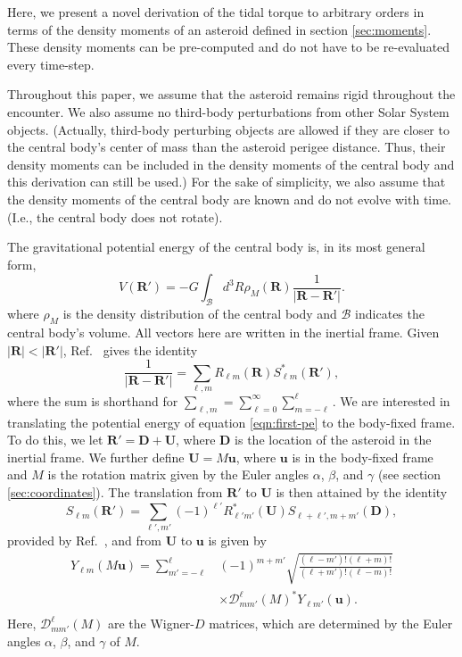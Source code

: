\documentclass[fleqn,usenatbib]{mnras}
\begin{document}
Here, we present a novel derivation of the tidal torque to arbitrary orders in terms of the density moments of an asteroid defined in section \ref{sec:moments}. These density moments can be pre-computed and do not have to be re-evaluated every time-step.

Throughout this paper, we assume that the asteroid remains rigid throughout the encounter. We also assume no third-body perturbations from other Solar System objects. (Actually, third-body perturbing objects are allowed if they are closer to the central body's center of mass than the asteroid perigee distance. Thus, their density moments can be included in the density moments of the central body and this derivation can still be used.) For the sake of simplicity, we also assume that the density moments of the central body are known and do not evolve with time. (I.e., the central body does not rotate).

The gravitational potential energy of the central body is, in its most general form,
\begin{equation}
V(\bm R') = -G\int_\mathcal{B} d^3 R \rho_M(\bm R) \frac{1}{|\bm{R}-\bm{R'}|}.
\label{eqn:first-pe}
\end{equation}
where $\rho_M$ is the density distribution of the central body and $\mathcal{B}$ indicates the central body's volume. All vectors here are written in the inertial frame. Given $|\bm{R}| < |\bm{R'}|$, Ref.~\cite{Gelderen1998TheSO} gives the identity
\begin{equation}
  \frac{1}{|\bm R - \bm R'|} = \sum_{\ell, m} R_{\ell m}(\bm R) S_{\ell m}^*(\bm R'),
  \label{eqn:ylm-expansion}
\end{equation}
where the sum is shorthand for $\sum_{\ell, m} = \sum_{\ell = 0}^\infty \sum_{m=-\ell}^\ell$.
We are interested in translating the potential energy of equation \ref{eqn:first-pe} to the body-fixed frame. To do this, we let $\bm{R'} = \bm D + \bm U$, where $\bm D$ is the location of the asteroid in the inertial frame. We further define $\bm U = M\bm u$, where $\bm u$ is in the body-fixed frame and $M$ is the rotation matrix given by the Euler angles $\alpha$, $\beta$, and $\gamma$ (see section \ref{sec:coordinates}). The translation from $\bm {R'}$ to $\bm U$ is then attained by the identity 
\begin{equation}
  S_{\ell m}(\bm R') = \sum_{\ell', m'} (-1)^{\ell'}R^*_{\ell' m'}(\bm U)S_{\ell+\ell', m + m'} (\bm D),
  \label{eqn:ylm-translation}
\end{equation}  
provided by Ref.~\cite{Gelderen1998TheSO}, and from $\bm U$ to $\bm u$ is given by
\begin{equation}
  \begin{split}
    Y_{\ell m}(M\bm u) = \sum_{m'=-\ell}^\ell & (-1)^{m+m'}\sqrt{\frac{(\ell-m')!(\ell+m)!}{(\ell+m')!(\ell-m)!}} \\
    & \times \mathcal{D}^\ell_{mm'}(M)^* Y_{\ell m'}(\bm u).\\
  \end{split}
  \label{eqn:ylm-rotation}
\end{equation}
Here, $\mathcal{D}^\ell_{mm'}(M)$ are the Wigner-$D$ matrices, which are determined by the Euler angles $\alpha$, $\beta$, and $\gamma$ of $M$.
\end{document}
